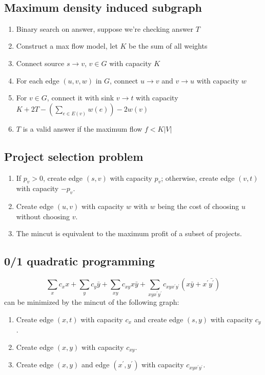 \

\subsection{Maximum density induced subgraph}
\vspace{-0.2em}
\begin{enumerate}
	\itemsep-0.8em
	\item Binary search on answer, suppose we're checking answer $T$
	\item Construct a max flow model, let $K$ be the sum of all weights
	\item Connect source $s \rightarrow v$, $v \in G$ with capacity $K$
	\item For each edge $(u, v, w)$ in $G$, connect $u \rightarrow v$ and $v \rightarrow u$ with capacity $w$
	\item For $v \in G$, connect it with sink $v \rightarrow t$ with capacity $K + 2T - (\sum_{e \in E(v)}{w(e)}) - 2w(v)$
	\item $T$ is a valid answer if the maximum flow $f < K \lvert V \rvert$
\end{enumerate}

\subsection{Project selection problem}
\vspace{-0.2em}
    \begin{enumerate}
		\itemsep-0.8em
      \item If $p_v > 0$, create edge $(s, v)$ with capacity $p_v$; otherwise, create edge $(v, t)$ with capacity $-p_v$.
      \item Create edge $(u, v)$ with capacity $w$ with $w$ being the cost of choosing $u$ without choosing $v$.
      \item The mincut is equivalent to the maximum profit of a subset of projects.
    \end{enumerate}

\subsection{0/1 quadratic programming}
\vspace{-0.2em}
    \[ \sum_x{c_xx} + \sum_y{c_y\bar{y}} + \sum_{xy}c_{xy}x\bar{y} + \sum_{xyx^\prime y^\prime}c_{xyx^\prime y^\prime}(x\bar{y} + x^\prime\bar{y^\prime}) \]
    can be minimized by the mincut of the following graph:
    \begin{enumerate}
      \itemsep-0.8em
      \item Create edge $(x, t)$ with capacity $c_x$ and create edge $(s, y)$ with capacity $c_y$.
      \item Create edge $(x, y)$ with capacity $c_{xy}$.
      \item Create edge $(x, y)$ and edge $(x^\prime, y^\prime)$ with capacity $c_{xyx^\prime y^\prime}$.
    \end{enumerate}

